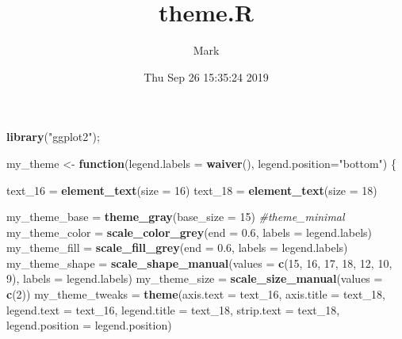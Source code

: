 \documentclass[]{article}
\title{theme.R}
\author{Mark}
\date{Thu Sep 26 15:35:24 2019}
\newenvironment{Shaded}{\begin{snugshade}}{\end{snugshade}}
\newcommand{\CommentTok}[1]{\textcolor[rgb]{0.56,0.35,0.01}{\textit{#1}}}
\newcommand{\ControlFlowTok}[1]{\textcolor[rgb]{0.13,0.29,0.53}{\textbf{#1}}}
\newcommand{\DataTypeTok}[1]{\textcolor[rgb]{0.13,0.29,0.53}{#1}}
\newcommand{\DecValTok}[1]{\textcolor[rgb]{0.00,0.00,0.81}{#1}}
\newcommand{\FloatTok}[1]{\textcolor[rgb]{0.00,0.00,0.81}{#1}}
\newcommand{\KeywordTok}[1]{\textcolor[rgb]{0.13,0.29,0.53}{\textbf{#1}}}
\newcommand{\NormalTok}[1]{#1}
\newcommand{\StringTok}[1]{\textcolor[rgb]{0.31,0.60,0.02}{#1}}
\begin{document}
\maketitle

\begin{Shaded}
\begin{Highlighting}[]
\KeywordTok{library}\NormalTok{(}\StringTok{"ggplot2"}\NormalTok{);}

\NormalTok{my_theme <-}\StringTok{ }\ControlFlowTok{function}\NormalTok{(}\DataTypeTok{legend.labels =} \KeywordTok{waiver}\NormalTok{(), }\DataTypeTok{legend.position=}\StringTok{"bottom"}\NormalTok{) \{}

\NormalTok{    text_}\DecValTok{16}\NormalTok{ =}\StringTok{ }\KeywordTok{element_text}\NormalTok{(}\DataTypeTok{size =} \DecValTok{16}\NormalTok{)}
\NormalTok{    text_}\DecValTok{18}\NormalTok{ =}\StringTok{ }\KeywordTok{element_text}\NormalTok{(}\DataTypeTok{size =} \DecValTok{18}\NormalTok{)}

\NormalTok{    my_theme_base   =}\StringTok{ }\KeywordTok{theme_gray}\NormalTok{(}\DataTypeTok{base_size =} \DecValTok{15}\NormalTok{) }\CommentTok{#theme_minimal}
\NormalTok{    my_theme_color  =}\StringTok{ }\KeywordTok{scale_color_grey}\NormalTok{(}\DataTypeTok{end =} \FloatTok{0.6}\NormalTok{, }\DataTypeTok{labels =}\NormalTok{ legend.labels)}
\NormalTok{    my_theme_fill   =}\StringTok{ }\KeywordTok{scale_fill_grey}\NormalTok{(}\DataTypeTok{end =} \FloatTok{0.6}\NormalTok{, }\DataTypeTok{labels =}\NormalTok{ legend.labels)}
\NormalTok{    my_theme_shape  =}\StringTok{ }\KeywordTok{scale_shape_manual}\NormalTok{(}\DataTypeTok{values =} \KeywordTok{c}\NormalTok{(}\DecValTok{15}\NormalTok{, }\DecValTok{16}\NormalTok{, }\DecValTok{17}\NormalTok{, }\DecValTok{18}\NormalTok{, }\DecValTok{12}\NormalTok{, }\DecValTok{10}\NormalTok{, }\DecValTok{9}\NormalTok{), }\DataTypeTok{labels =}\NormalTok{ legend.labels)}
\NormalTok{    my_theme_size   =}\StringTok{ }\KeywordTok{scale_size_manual}\NormalTok{(}\DataTypeTok{values =} \KeywordTok{c}\NormalTok{(}\DecValTok{2}\NormalTok{))}
\NormalTok{    my_theme_tweaks =}\StringTok{ }\KeywordTok{theme}\NormalTok{(}\DataTypeTok{axis.text =}\NormalTok{ text_}\DecValTok{16}\NormalTok{, }\DataTypeTok{axis.title =}\NormalTok{ text_}\DecValTok{18}\NormalTok{, }\DataTypeTok{legend.text =}\NormalTok{ text_}\DecValTok{16}\NormalTok{, }\DataTypeTok{legend.title =}\NormalTok{ text_}\DecValTok{18}\NormalTok{, }\DataTypeTok{strip.text =}\NormalTok{ text_}\DecValTok{18}\NormalTok{, }\DataTypeTok{legend.position =}\NormalTok{ legend.position)}


\end{Highlighting}
\end{Shaded}
\end{document}
